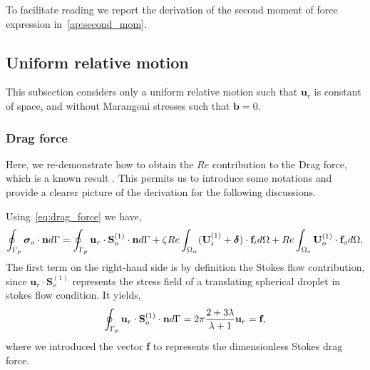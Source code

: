To facilitate reading we report the derivation of the second moment of force expression in~\ref{ap:second_mom}. 


\subsection{Uniform relative motion}

This subsection considers only a uniform relative motion such that $\textbf{u}_r$ is constant of space, and without Marangoni stresses such that $\textbf{b}=0$.

\subsubsection{Drag force}

Here, we re-demonstrate how to obtain the $Re$ contribution to the Drag force, which is a known result \citep{proudman1957expansions, stone2001inertial}. 
This permits us to introduce some notations and provide a clearer picture of the derivation for the following discussions. 

Using~\ref{eq:drag_force} we have, 
\begin{equation}
    \intS[p]{\bm\sigma_{o}\cdot \textbf{n}}
    =
    \intS[p]{\textbf{u}_{r}\cdot \textbf{S}_{o}^{(1)}\cdot \textbf{n}}
    + \zeta Re \intO{(\textbf{U}_{i}^{(1)} + \bm\delta)\cdot \textbf{f}_{i}} 
    + Re\intO[o]{\textbf{U}_{o}^{(1)}\cdot \textbf{f}_{o}}. 
    \label{eq:drag_force_application}
\end{equation}
The first term on the right-hand side is by definition the Stokes flow contribution, since $\textbf{u}_{r}\cdot \textbf{S}_{o}^{(1)}$ represents the stress field of a translating spherical droplet in stokes flow condition. 
It yields, 
\begin{equation}
    \intS[p]{\textbf{u}_{r}\cdot \textbf{S}_{o}^{(1)}\cdot \textbf{n}}
    = 2 \pi \frac{2+3\lambda}{\lambda+1} \textbf{u}_r
    =\textbf{f},
    \label{eq:stokes_force}
\end{equation}
where we introduced the vector \textbf{f} to represents the dimensionless Stokes drag force. 

